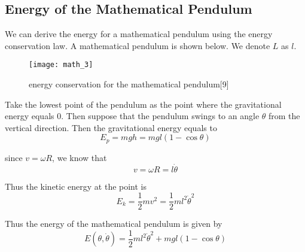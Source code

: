 \documentclass{article}
\begin{document}
\subsection{Energy of the Mathematical Pendulum}
\par We can derive the energy for a mathematical pendulum using the energy conservation law. A mathematical pendulum is shown below. We denote $L$  as $l $.
\begin{figure}[H]
  \centering
  \texttt{[image: math\_3]}
  \caption{energy conservation for the mathematical pendulum[9]}
\end{figure}
 Take the lowest point of the pendulum as the point where the gravitational energy equals 0. Then suppose that the pendulum swings to an angle $\theta$ from the vertical direction. Then the gravitational energy equals to 
\begin{equation*}
E_p = mgh = mgl(1- \cos\theta)
\end{equation*}
	\par since $ v= \omega R$, we know that 
\begin{equation*}
v = \omega R = l \dot{\theta}
\end{equation*}
	\par Thus the kinetic energy at the point is 
\begin{equation*}
E_k = \frac{1}{2}mv^2 = \frac{1}{2} m l^2 \dot{\theta}^2
\end{equation*}
	\par Thus the energy of the mathematical pendulum is given by
\begin{equation}
E (\theta, \dot{\theta}) =  \frac{1}{2} m l^2 \dot{\theta}^2 + mgl(1- \cos\theta)
\end{equation}
\end{document}
